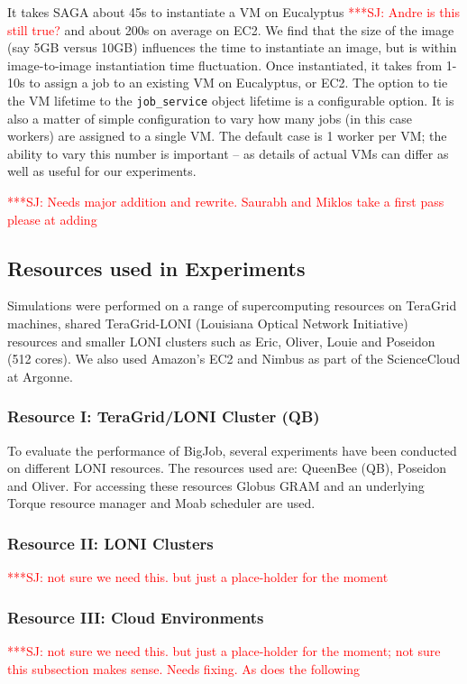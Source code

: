 \documentclass[3p,twocolumn]{elsarticle}
\newcommand{\jhanote}[1]{ {\textcolor{red} { ***SJ: #1 }}}
\newcommand{\jhanote}[1]{}
\begin{document}
It takes SAGA about 45s to instantiate a VM on Eucalyptus
\jhanote{Andre is this still true?}  and about 200s on average on EC2.
We find that the size of the image (say 5GB versus 10GB) influences
the time to instantiate an image, but is within image-to-image
instantiation time fluctuation.  Once instantiated, it takes from
1-10s to assign a job to an existing VM on Eucalyptus, or EC2.  The
option to tie the VM lifetime to the \texttt{job\_service} object
lifetime is a configurable option.  It is also a matter of simple
configuration to vary how many jobs (in this case workers) are
assigned to a single VM. The default case is 1 worker per VM; the
ability to vary this number is important -- as details of actual VMs
can differ as well as useful for our experiments.

\jhanote{Needs major addition and rewrite. Saurabh and Miklos take a
  first pass please at adding}

\subsection{Resources used in Experiments}

Simulations were performed on a range of supercomputing resources on
TeraGrid machines, shared TeraGrid-LONI (Louisiana Optical Network
Initiative)~\cite{LONI_web} resources and smaller LONI clusters such
as Eric, Oliver, Louie and Poseidon (512 cores).  We also used
Amazon's EC2 and Nimbus as part of the ScienceCloud at Argonne.

\subsubsection*{Resource I: TeraGrid/LONI Cluster (QB)}

To evaluate the performance of BigJob, several experiments have been
conducted on different LONI resources. The resources used are:
QueenBee (QB), Poseidon and Oliver. For accessing these resources
Globus GRAM and an underlying Torque resource manager and Moab
scheduler are used.

\subsubsection*{Resource II: LONI Clusters}
\jhanote{not sure we need this. but just a place-holder for the moment}


\subsubsection*{Resource III: Cloud Environments}
\jhanote{not sure we need this. but just a place-holder for the
  moment; not sure this subsection makes sense. Needs fixing. As does
  the following}
\end{document}
